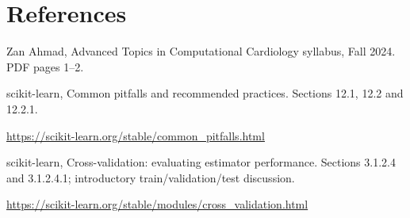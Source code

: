 \documentclass[11pt,letterpaper]{article}
\theoremstyle{definition}\newtheorem{definition}{Definition}\newtheorem{example}{Example}
\numberwithin{equation}{section}
\begin{document}
\section*{References}
\noindent\begin{minipage}{\linewidth}
Zan Ahmad, Advanced Topics in Computational Cardiology syllabus, Fall 2024. PDF pages 1--2.

\end{minipage}\par\medskip
\noindent\begin{minipage}{\linewidth}
scikit-learn, Common pitfalls and recommended practices. Sections 12.1, 12.2 and 12.2.1.

\url{https://scikit-learn.org/stable/common_pitfalls.html}
\end{minipage}\par\medskip
\noindent\begin{minipage}{\linewidth}
scikit-learn, Cross-validation: evaluating estimator performance. Sections 3.1.2.4 and 3.1.2.4.1; introductory train/validation/test discussion.

\url{https://scikit-learn.org/stable/modules/cross_validation.html}
\end{minipage}\par\medskip
\end{document}
